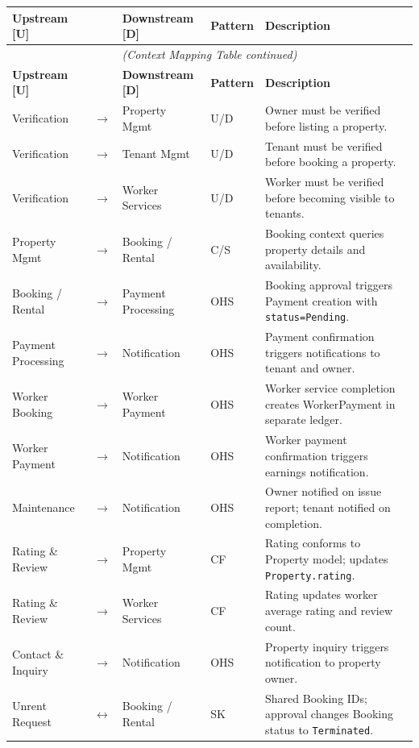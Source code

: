 \documentclass[12pt,a4paper]{article}
\begin{document}
\begin{longtable}{@{}p{3.2cm}p{0.5cm}p{3.2cm}p{2.2cm}p{5.2cm}@{}}
\toprule
\textbf{Upstream [U]} & & \textbf{Downstream [D]} & \textbf{Pattern} & \textbf{Description} \\
\midrule
\endfirsthead
\multicolumn{5}{c}{\textit{(Context Mapping Table continued)}} \\
\toprule
\textbf{Upstream [U]} & & \textbf{Downstream [D]} & \textbf{Pattern} & \textbf{Description} \\
\midrule
\endhead
\bottomrule
\endfoot
Verification & $\rightarrow$ & Property Mgmt & U/D & Owner must be verified before listing a property. \\[3pt]
Verification & $\rightarrow$ & Tenant Mgmt & U/D & Tenant must be verified before booking a property. \\[3pt]
Verification & $\rightarrow$ & Worker Services & U/D & Worker must be verified before becoming visible to tenants. \\[3pt]
Property Mgmt & $\rightarrow$ & Booking / Rental & C/S & Booking context queries property details and availability. \\[3pt]
Booking / Rental & $\rightarrow$ & Payment Processing & OHS & Booking approval triggers Payment creation with \texttt{status=Pending}. \\[3pt]
Payment Processing & $\rightarrow$ & Notification & OHS & Payment confirmation triggers notifications to tenant and owner. \\[3pt]
Worker Booking & $\rightarrow$ & Worker Payment & OHS & Worker service completion creates WorkerPayment in separate ledger. \\[3pt]
Worker Payment & $\rightarrow$ & Notification & OHS & Worker payment confirmation triggers earnings notification. \\[3pt]
Maintenance & $\rightarrow$ & Notification & OHS & Owner notified on issue report; tenant notified on completion. \\[3pt]
Rating \& Review & $\rightarrow$ & Property Mgmt & CF & Rating conforms to Property model; updates \texttt{Property.rating}. \\[3pt]
Rating \& Review & $\rightarrow$ & Worker Services & CF & Rating updates worker average rating and review count. \\[3pt]
Contact \& Inquiry & $\rightarrow$ & Notification & OHS & Property inquiry triggers notification to property owner. \\[3pt]
Unrent Request & $\leftrightarrow$ & Booking / Rental & SK & Shared Booking IDs; approval changes Booking status to \texttt{Terminated}. \\[3pt]

\end{longtable}
\end{document}
